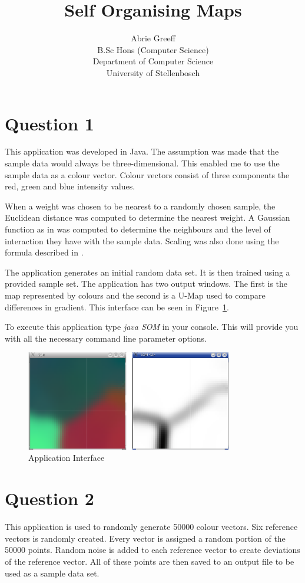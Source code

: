 \documentclass[a4paper,11pt,titlepage]{article}
\author{Abrie Greeff\\B.Sc Hons (Computer Science)\\Department of Computer Science\\University of Stellenbosch}
\title{Self Organising Maps}
\begin{document}
\maketitle
\tableofcontents

\section{Question 1}
This application was developed in Java. The assumption was made that the sample data would always be three-dimensional. This enabled me to use the sample data as a colour vector. Colour vectors consist of three components the red, green and blue intensity values.

When a weight was chosen to be nearest to a randomly chosen sample, the Euclidean distance was computed to determine the nearest weight. A Gaussian function as in \cite{web1} was computed to determine the neighbours and the level of interaction they have with the sample data. Scaling was also done using the formula described in \cite{web1}.

The application generates an initial random data set. It is then trained using a provided sample set. The application has two output windows. The first is the map represented by colours and the second is a U-Map used to compare differences in gradient. This interface can be seen in Figure~\ref{Figure:gui}.

To execute this application type \emph{java SOM} in your console. This will provide you with all the necessary command line parameter options.

\begin{figure}[htbp]
   \centering
   \includegraphics[width=9cm]{gui.png}
   \caption{Application Interface}
   \label{Figure:gui}
\end{figure}

\section{Question 2}
This application is used to randomly generate 50000 colour vectors. Six reference vectors is randomly created. Every vector is assigned a random portion of the 50000 points. Random noise is added to each reference vector to create deviations of the reference vector. All of these points are then saved to an output file to be used as a sample data set.
\end{document}
